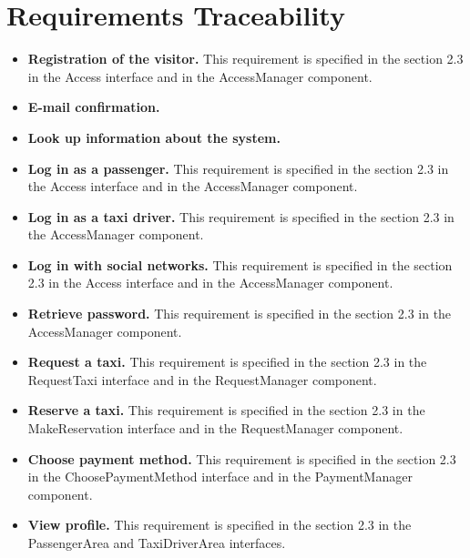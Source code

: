 \documentclass[18pt,oneside,a4paper, titlepage]{article}
\begin{document}
	\section{Requirements Traceability}
		\begin{itemize}
			\item \textbf{Registration of the visitor.} This requirement is specified in the section 2.3 in the Access interface and in the AccessManager component.
			
			\item \textbf{E-mail confirmation.}
			
			\item \textbf{Look up information about the system.}
			
			\item \textbf{Log in as a passenger.} This requirement is specified in the section 2.3 in the Access interface and in the AccessManager component.
		
			\item \textbf{Log in as a taxi driver.} This requirement is specified in the section 2.3 in the AccessManager component.
		
			\item \textbf{Log in with social networks.} This requirement is specified in the section 2.3 in the Access interface and in the AccessManager component.
			
			\item \textbf{Retrieve password.} This requirement is specified in the section 2.3 in the AccessManager component.
			
			\item \textbf{Request a taxi.} This requirement is specified in the section 2.3 in the RequestTaxi interface and in the RequestManager component.
			
			\item \textbf{Reserve a taxi.} This requirement is specified in the section 2.3 in the MakeReservation interface and in the RequestManager component.
			
			\item \textbf{Choose payment method.} This requirement is specified in the section 2.3 in the ChoosePaymentMethod interface and in the PaymentManager component.
			
			\item \textbf{View profile.} This requirement is specified in the section 2.3 in the PassengerArea and TaxiDriverArea interfaces.
			

\end{itemize}
\end{document}
